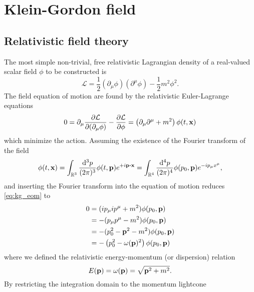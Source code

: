 \section{Klein-Gordon field}

\subsection{Relativistic field theory}

The most simple non-trivial, free relativistic Lagrangian density of a real-valued scalar field $\phi$ to be constructed is
\begin{equation}
	\mathcal{L}
	=
	\frac{1}{2}
	\left(\partial_\mu\phi\right)
	\left(\partial^\mu\phi\right)
	-
	\frac{1}{2}
	m^2\phi^2
	\label{eq:kg_lagrangian}.
\end{equation}
The field equation of motion are found by the relativistic Euler-Lagrange equations
\begin{equation}
	0
	=
	\partial_\mu\pdv{\mathcal{L}}{(\partial_\mu\phi)}
	-
	\pdv{\mathcal{L}}{\phi}
	=
	\left(\partial_\mu\partial^\mu+m^2\right)
	\phi(t,\vb{x})
	\label{eq:kg_eom}
\end{equation}
which minimize the action.
Assuming the existence of the Fourier transform of the field
\begin{equation}
	\phi(t,\vb{x})
	=
	\int_{\mathbb{R}^3}\frac{\dd[3]{p}}{(2\pi)^3}
	\phi(t,\vb{p})e^{+i\vb{p}\vdot\vb{x}}
	=
	\int_{\mathbb{R}^4}\frac{\dd[4]{p}}{(2\pi)^4}
	\phi(p_0,\vb{p})e^{-ip_\mu x^\mu}
	\label{eq:kg_ft_naive},
\end{equation}
and inserting the Fourier transform into the equation of motion reduces \cref{eq:kg_eom} to
\begin{equation}
	\begin{split}
		0
		&=
		(ip_\mu ip^\mu+m^2)\phi(p_0,\vb{p})
		\\
		&=
		-(p_\mu p^\mu-m^2)\phi(p_0,\vb{p})
		\\
		&=
		-(p_0^2-\vb{p}^2-m^2)\phi(p_0,\vb{p})
		\\
		&=
		-\left(p_0^2-\omega(\vb{p})^2\right)\phi(p_0,\vb{p})
	\end{split}
	\label{eq:kg_eom_ft}
\end{equation}
where we defined the relativistic energy-momentum (or dispersion) relation
\begin{equation}
	E(\vb{p})
	=
	\omega(\vb{p})
	=
	\sqrt{\vb{p}^2+m^2}
	\label{eq:energy_momentum_relation}.
\end{equation}
By restricting the integration domain to the momentum lightcone
